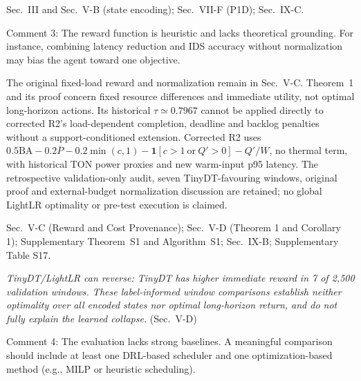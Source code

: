 \documentclass[10pt,a4paper]{article}
\begin{document}
\begin{wherebox}
Sec.~III and Sec.~V-B (state encoding); Sec.~VII-F (P1D); Sec.~IX-C.
\end{wherebox}

\begin{rcommentbox}
Comment 3: The reward function is heuristic and lacks theoretical grounding. For instance, combining latency reduction and IDS accuracy without normalization may bias the agent toward one objective.
\end{rcommentbox}

\begin{authorresponsebox}
The original fixed-load reward and normalization remain in Sec.~V-C. Theorem~1 and its proof concern fixed resource differences and immediate utility, not optimal long-horizon actions. Its historical $\tau\simeq0.7967$ cannot be applied directly to corrected R2's load-dependent completion, deadline and backlog penalties without a support-conditioned extension. Corrected R2 uses $0.5\mathrm{BA}-0.2\overline P-0.2\min(c,1)-\mathbf1[c>1\ \mathrm{or}\ Q'>0]-Q'/W$, no thermal term, with historical TON power proxies and new warm-input p95 latency. The retrospective validation-only audit, seven TinyDT-favouring windows, original proof and external-budget normalization discussion are retained; no global LightLR optimality or pre-test execution is claimed.
\end{authorresponsebox}

\begin{wherebox}
Sec.~V-C (Reward and Cost Provenance); Sec.~V-D (Theorem 1 and Corollary 1); Supplementary Theorem~S1 and Algorithm~S1; Sec.~IX-B; Supplementary Table S17.
\end{wherebox}
\begin{excerptbox}
\emph{TinyDT/LightLR can reverse: TinyDT has higher immediate reward in 7 of 2{,}500 validation windows. These label-informed window comparisons establish neither optimality over all encoded states nor optimal long-horizon return, and do not fully explain the learned collapse.} (Sec.~V-D)
\end{excerptbox}

\begin{rcommentbox}
Comment 4: The evaluation lacks strong baselines. A meaningful comparison should include at least one DRL-based scheduler and one optimization-based method (e.g., MILP or heuristic scheduling).
\end{rcommentbox}
\end{document}
